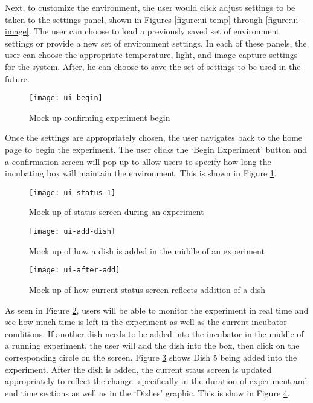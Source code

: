 Next, to customize the environment, the user would click adjust settings to be taken to the settings panel, shown in Figures \ref{figure:ui-temp} through \ref{figure:ui-image}. The user can choose to load a previously saved set of environment settings or provide a new set of environment settings. In each of these panels, the user can choose the appropriate temperature, light, and image capture settings for the system. After, he can choose to save the set of settings to be used in the future. 

\begin{figure}[H]
\texttt{[image: ui-begin]}
\caption{\label{figure:ui-begin} Mock up confirming experiment begin }
\end{figure}


Once the settings are appropriately chosen, the user navigates back to the home page to begin the experiment. The user clicks the `Begin Experiment' button and a confirmation screen will pop up to allow users to specify how long the incubating box will maintain the environment. This is shown in Figure \ref{figure:ui-begin}.


\begin{figure}[H]
\texttt{[image: ui-status-1]}
\caption{\label{figure:ui-status} Mock up of status screen during an experiment}
\end{figure}

\begin{figure}[H]
\texttt{[image: ui-add-dish]}
\caption{\label{figure:ui-add} Mock up of how a dish is added in the middle of an experiment}
\end{figure}

\begin{figure}[H]
\texttt{[image: ui-after-add]}
\caption{\label{figure:ui-after-add} Mock up of how current status screen reflects addition of a dish}
\end{figure}

As seen in Figure \ref{figure:ui-status}, users will be able to monitor the experiment in real time and see how much time is left in the experiment as well as the current incubator conditions. If another dish needs to be added into the incubator in the middle of a running experiment, the user will add the dish into the box, then click on the corresponding circle on the screen. Figure \ref{figure:ui-add} shows Dish 5 being added into the experiment.  After the dish is added, the current staus screen is updated appropriately to reflect the change- specifically in the duration of experiment and end time sections as well as in the `Dishes' graphic. This is show in Figure \ref{figure:ui-after-add}.


